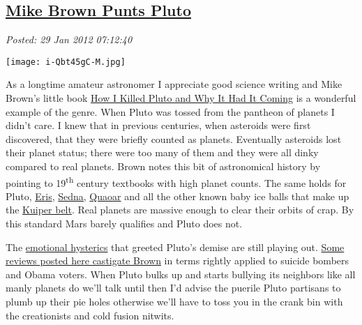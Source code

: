 %

\subsection*{\href{https://bakerjd99.wordpress.com/2012/01/29/mike-brown-punts-pluto/}{Mike Brown Punts Pluto}}


\noindent\emph{Posted: 29 Jan 2012 07:12:40}
\vspace{6pt}


\captionsetup[floatingfigure]{labelformat=empty}
\begin{floatingfigure}[l]{0.26\textwidth}
\centering
\texttt{[image: i-Qbt45gC-M.jpg]}
\label{fig:2348X0}
\end{floatingfigure} As a longtime amateur astronomer I appreciate good science writing and
Mike Brown's little book
\href{http://www.amazon.com/How-Killed-Pluto-Why-Coming/dp/0385531087}{How
I Killed Pluto and Why It Had It Coming} is a wonderful example of the
genre. When Pluto was tossed from the pantheon of planets I didn't care.
I knew that in previous centuries, when asteroids were first discovered,
that they were briefly counted as planets. Eventually asteroids lost
their planet status; there were too many of them and they were all dinky
compared to real planets. Brown notes this bit of astronomical history
by pointing to 19\textsuperscript{th} century textbooks with high planet counts. The same
holds for Pluto,
\href{http://www.astronomytoday.com/astronomy/eris.html}{Eris},
 \href{http://www.nasa.gov/vision/universe/solarsystem/planet\_like\_body.html}{Sedna,} \href{http://news.nationalgeographic.com/news/2002/10/1003\_021007\_quaoar.html}{Quaoar}
and all the other known baby ice balls that make up the
\href{http://solarsystem.nasa.gov/planets/profile.cfm?Object=KBOs\&Display=OverviewLong}{Kuiper
belt}. Real planets are massive enough to clear their orbits of crap. By
this standard Mars barely qualifies and Pluto does not.

The \href{http://www.youtube.com/watch?v=eNaNxo9jFHE}{emotional
hysterics} that greeted Pluto's demise are still playing out.
\href{http://www.goodreads.com/review/show/257414013}{Some reviews
posted here castigate Brown} in terms rightly applied to suicide bombers
and Obama voters. When Pluto bulks up and starts bullying its neighbors
like all manly planets do we'll talk until then I'd advise the puerile
Pluto partisans to plumb up their pie holes otherwise we'll have to toss
you in the crank bin with the creationists and cold fusion nitwits.

